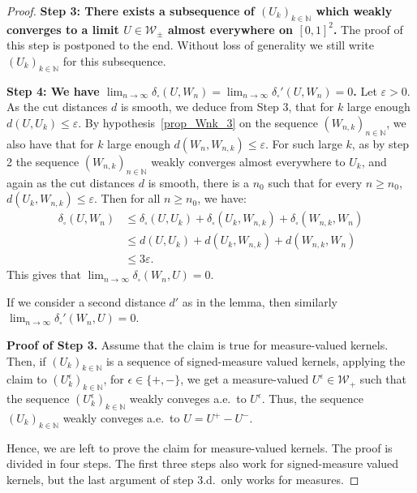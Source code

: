 \documentclass{amsart}
\newcommand{\aE}{a.e.\ }
\theoremstyle{plain}
\theoremstyle{definition}
\newcommand{\signed}{\pm}
\newcommand{\Kernel}{\mathcal{W}_{\signed}}
\newcommand{\Kernelp}{\mathcal{W}_{+}}
\newcommand{\dd}{\delta_{\square}}
\newcommand{\ddPrime}{\delta_{\square}'}
\newcommand{\dPrime}{d'}
\newcommand{\N}{\mathbb{N}}
\newcommand{\eps}{\varepsilon}
\begin{document}
\begin{proof}
\textbf{Step 3: There exists a subsequence
of   $(U_k )_{k\in\N}$ which weakly
  converges to a limit $U\in \Kernel$  almost everywhere on $[0,1]^2$.}
The proof of this step is postponed to the end. Without loss of
generality we still write  $(U_k )_{k\in\N}$ for this subsequence. 

\medskip

\textbf{Step 4: We have $\lim_{n\rightarrow \infty } \dd (U, W_n)=
  \lim_{n\rightarrow \infty } \ddPrime (U, W_n)=0$.}
Let  $\eps > 0$.
As the cut distances $d$ is smooth, we deduce from Step 3, that for $k$ large enough
$d(U, U_k) \leq  \varepsilon$. By hypothesis~\ref{prop_Wnk_3} on the sequence $(W_{n,k})_{n\in \N}$, 
we also have that for $k$ large enough
$d(W_n, W_{n,k}) \leq  \varepsilon$. 
For such large $k$, as by step 2 the sequence $(W_{n,k} )_{n\in\N}$ 
	weakly converges almost everywhere to $U_k$,
and again as the cut distances $d$ is smooth, 
there is a $n_0$ such that for every $n\geq n_0$,
$d(U_k, W_{n,k}) \leq  \eps$.
Then for all $n\geq n_0$,
we have:
\begin{align*}
\dd(U,W_n) 
&  \leq   \dd(U,U_k) + \dd(U_k, W_{n,k}) + \dd(W_{n,k},W_n)  \\
&  \leq   d(U,U_k) + d(U_k, W_{n,k}) + d(W_{n,k}, W_n) \\
&  \leq   3\varepsilon.
\end{align*}
This gives that $\lim_{n\rightarrow \infty } \dd (W_n, U)=0$.

If we consider a second distance $\dPrime$
as in the lemma, then similarly $\lim_{n\rightarrow \infty } \ddPrime (W_n, U)=0$.

\medskip

\textbf{Proof of Step 3.} 
Assume that the claim is true for measure-valued kernels.
Then, if $(U_k)_{k\in\N}$ is a sequence of signed-measure valued kernels,
	applying the claim to $(U_k^\epsilon)_{k\in\N}$, for $\epsilon\in\{+,-\}$,
	we get a measure-valued $U^\epsilon\in\Kernelp$ such that
	the sequence $(U_k^\epsilon)_{k\in\N}$ weakly conveges \aE to $U^\epsilon$.
Thus, the sequence $(U_k)_{k\in\N}$ weakly conveges \aE to $U = U^+ - U^-$.

Hence, we are left to prove the claim for measure-valued kernels.
The proof is divided in four steps.
The first three steps also work for signed-measure valued kernels,
	but the last argument of step 3.d.\ only works for measures.


\end{proof}
\end{document}
